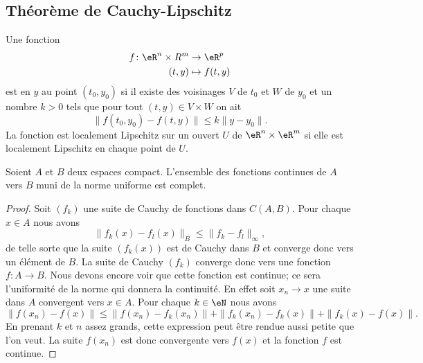 \subsection{Théorème de Cauchy-Lipschitz}

\begin{definition}
    Une fonction 
    \begin{equation}
        \begin{aligned}
            f\colon \eR^n\times R^m&\to \eR^p \\
            (t,y)&\mapsto f(t,y) 
        \end{aligned}
    \end{equation}
    est  en \( y\) au point \( (t_0,y_0)\) si il existe des voisinages \( V\) de \( t_0\) et \( W\) de \( y_0\) et un nombre \( k>0\) tels que pour tout \( (t,y)\in V\times W\) on ait
    \begin{equation}
        \big\| f(t_0,y_0)-f(t,y) \big\|\leq k\| y-y_0 \|.
    \end{equation}
    La fonction est localement Lipschitz sur un ouvert \( U\) de \( \eR^n\times \eR^m\) si elle est localement Lipschitz en chaque point de \( U\).
\end{definition}

\begin{lemma}       \label{LemdLKKnd}
    Soient \( A\) et \( B\) deux espaces compact. L'ensemble des fonctions continues de \( A\) vers \( B\) muni de la norme uniforme est complet.
\end{lemma}

\begin{proof}
    Soit \( (f_k)\) une suite de Cauchy de fonctions dans \( C(A,B)\). Pour chaque \( x\in A \) nous avons
    \begin{equation}
        \| f_k(x)-f_l(x) \|_B\leq \| f_k-f_l \|_{\infty},
    \end{equation}
    de telle sorte que la suite \( (f_k(x))\) est de Cauchy dans \( B\) et converge donc vers un élément de \( B\). La suite de Cauchy \( (f_k)\) converge donc vers une fonction \( f\colon A\to B\). Nous devons encore voir que cette fonction est continue; ce sera l'uniformité de la norme qui donnera la continuité. En effet soit \( x_n\to x\) une suite dans \( A\) convergent vers \( x\in A\). Pour chaque \( k\in \eN\) nous avons
    \begin{equation}
        \| f(x_n)-f(x) \|\leq \| f(x_n)-f_k(x_n) \|  +\| f_k(x_n)-f_k(x) \|+\| f_k(x)-f(x) \|.
    \end{equation}
    En prenant \( k\) et \( n\) assez grands, cette expression peut être rendue aussi petite que l'on veut. La suite \( f(x_n)\) est donc convergente vers \( f(x)\) et la fonction \( f\) est continue.
\end{proof}

